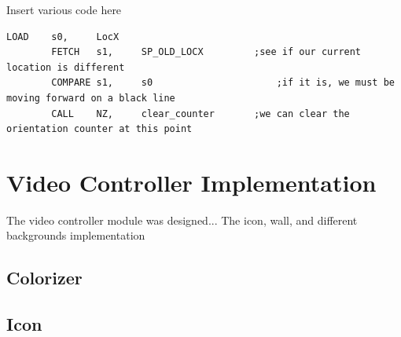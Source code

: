 \documentclass[11pt]{article}
\begin{document}
		
			
Insert various code here

\begin{lstlisting}[caption=Sequence used manage orientation counter , label=loc_check]		
		LOAD	s0, 	LocX
		FETCH	s1,		SP_OLD_LOCX			;see if our current location is different
		COMPARE	s1,		s0						;if it is, we must be moving forward on a black line
		CALL	NZ,		clear_counter		;we can clear the orientation counter at this point 	
 \end{lstlisting}

			
\section{Video Controller Implementation}
	The video controller module was designed...
	The icon, wall, and different backgrounds implementation
	
		
		\subsection{Colorizer}
		

%
				

				
		\subsection{Icon}
		
\end{document}
